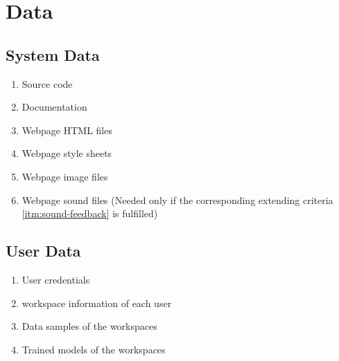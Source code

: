 \section{Data}
\subsection{System Data}
\begin{enumerate}[{label = \textbf{/D{\protect\twodigits{\arabic{enumi}}}0/}, leftmargin = *}]
    \item Source code
    \item Documentation
    \item Webpage HTML files
    \item Webpage style sheets
    \item Webpage image files
    \item Webpage sound files (Needed only if the corresponding extending criteria \ref{itm:sound-feedback} is fulfilled)
\end{enumerate}

\subsection{User Data}
\begin{enumerate}[resume*]
    \item User credentials
    \item \Gls{workspace} information of each user
    \item Data samples of the \glspl{workspace}
    \item Trained models of the \glspl{workspace}
\end{enumerate}
